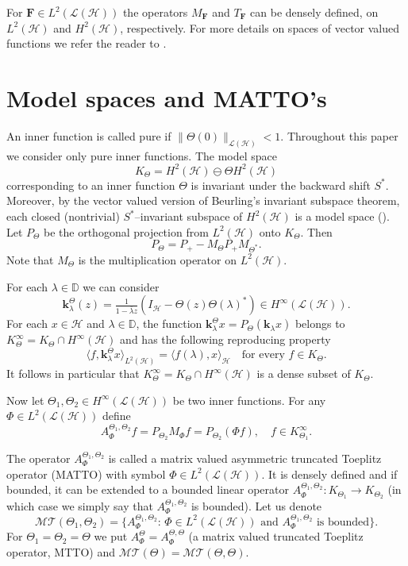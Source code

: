 \documentclass[11pt]{amsart}
\numberwithin{equation}{section}
\newcommand{\hsp}{\mathcal{H}}
\newcommand{\oL }{\mathcal{L}(\hsp) }
\newcommand{\ke}{{\mathbf{k}}}
\newcommand{\F}{{\mathbf{F}}}
\theoremstyle{definition}
\numberwithin{equation}{section}
\begin{document}
For $\F\in L^2(\oL )$ the operators $M_{\F}$ and $T_{\F}$ can be  densely defined, on $L^{2}(\hsp )$ and $H^{2}(\hsp )$, respectively.
 For more details on spaces of vector valued functions we refer the reader to \cite{berc,NF}.



\section{Model spaces and MATTO's}\label{s3}

An inner function is called pure if $\|\Theta(0)\|_{\oL}<1$. Throughout this paper we consider only pure inner functions.
The model space
$$K_{\Theta}=H^{2}(\hsp)\ominus \Theta H^{2}(\hsp)$$
corresponding to an inner function $\Theta$ is invariant under the backward shift $S^*$. Moreover, by the vector valued version of Beurling's invariant subspace theorem, each closed (nontrivial) $S^*$--invariant subspace of $H^2(\hsp)$ is a model space (\cite[Chapter 5, Theorem 1.10]{berc}). Let $P_{\Theta}$ be the orthogonal projection from $L^2(\hsp)$ onto $K_{\Theta}$. Then
$$P_{\Theta}=P_+-M_{\Theta}P_+M_{\Theta^*}.$$
Note that $M_{\Theta}$ is the multiplication operator on $L^{2}(\hsp)$.

For each $\lambda\in\mathbb{D}$ we can consider
$$\ke_{\lambda}^{\Theta}(z)=\tfrac1{1-\bar\lambda z}(I_\hsp-\Theta(z)\Theta(\lambda)^*)\in H^{\infty}(\oL).$$
For each $x\in\hsp$ and $\lambda\in\mathbb{D}$, the function $\ke_{\lambda}^{\Theta}x=P_{\Theta}(\ke_{\lambda}x)$  belongs to $K_{\Theta}^{\infty}=K_{\Theta}\cap H^{\infty}(\hsp )$ and has the following reproducing property
$$\langle f, \ke_{\lambda}^{\Theta}x\rangle_{L^2(\hsp)}=\langle f(\lambda), x\rangle_\hsp\quad\text{for every }f\in K_{\Theta}.$$
It follows in particular that $K_{\Theta}^{\infty}=K_{\Theta}\cap H^{\infty}(\hsp)$ is a dense subset of $K_{\Theta}$.

Now let $\Theta_{1},\Theta_{2}\in H^{\infty}(\oL)$ be two inner functions. For any $\Phi\in L^{2}(\oL)$ define
$$A_{\Phi}^{\Theta_{1}, \Theta_{2}}f=P_{\Theta_{2}}M_\Phi f=P_{\Theta_{2}}(\Phi f),\quad f\in K_{\Theta_{1}}^{\infty}.$$

The operator $A_{\Phi}^{\Theta_{1}, \Theta_{2}}$ is called a matrix valued asymmetric truncated Toeplitz operator (MATTO) with symbol $\Phi\in L^{2}(\oL)$. It is densely defined and if bounded, it can be extended to a bounded linear operator $A_{\Phi}^{\Theta_{1}, \Theta_{2}}:K_{\Theta_{1}}\to K_{\Theta_{2}}$ (in which case we simply say that $A_{\Phi}^{\Theta_{1}, \Theta_{2}}$ is bounded). Let us denote
$$\mathcal{MT}(\Theta_{1}, \Theta_{2})=\{A_{\Phi}^{\Theta_{1}, \Theta_{2}}:\, \Phi\in L^2(\oL)\text{ and }A_{\Phi}^{\Theta_{1}, \Theta_{2}} \text{ is bounded}\}.$$
For $\Theta_{1}=\Theta_{2}=\Theta$ we put $A_{\Phi}^{\Theta}=A_{\Phi}^{\Theta, \Theta}$ (a matrix valued truncated Toeplitz operator, MTTO) and $\mathcal{MT}(\Theta)=\mathcal{MT}(\Theta, \Theta)$.
\end{document}
